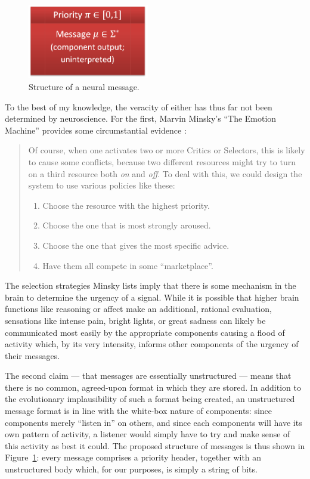 \begin{figure}[!h]
	\centering
	\includegraphics[width=150pt]{Figs/message.png}
	\caption{Structure of a neural message.}
	\label{fig:message}
\end{figure}

To the best of my knowledge, the veracity of either has thus far not been determined by neuroscience. For the first, Marvin Minsky's ``The Emotion Machine'' provides some circumstantial evidence \cite[p.\ 222]{emotionMachine}:

\begin{quote}
	Of course, when one activates two or more Critics or Selectors, this is likely to cause some conflicts, because two different resources might try to turn on a third resource both {\em on} and {\em off}. To deal with this, we could design the system to use various policies like these:
	
	\begin{enumerate}
		\item Choose the resource with the highest priority.
		\item Choose the one that is most strongly aroused.
		\item Choose the one that gives the most specific advice.
		\item Have them all compete in some ``marketplace''.
	\end{enumerate}
\end{quote}

The selection strategies Minsky lists imply that there is some mechanism in the brain to determine the urgency of a signal. While it is possible that higher brain functions like reasoning or affect make an additional, rational evaluation, sensations like intense pain, bright lights, or great sadness can likely be communicated most easily by the appropriate components causing a flood of activity which, by its very intensity, informs other components of the urgency of their messages.

The second claim --- that messages are essentially unstructured --- means that there is no common, agreed-upon format in which they are stored. In addition to the evolutionary implausibility of such a format being created, an unstructured message format is in line with the white-box nature of components: since components merely ``listen in'' on others, and since each components will have its own pattern of activity, a listener would simply have to try and make sense of this activity as best it could. The proposed structure of messages is thus shown in Figure~\ref{fig:message}: every message comprises a priority header, together with an unstructured body which, for our purposes, is simply a string of bits.

